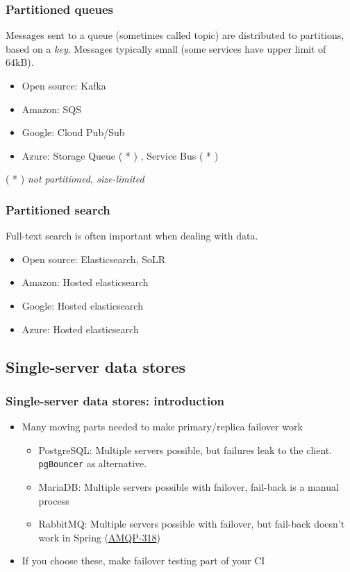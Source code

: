\documentclass[8pt]{article}
\begin{document}
\subsubsection{Partitioned queues}
\label{sec:orga696c1d}
Messages sent to a queue (sometimes called topic) are distributed to partitions, based on a \emph{key}.
Messages typically small (some services have upper limit of 64kB).

\begin{itemize}
\item Open source: Kafka
\item Amazon: SQS
\item Google: Cloud Pub/Sub
\item Azure: Storage Queue ( * ) , Service Bus ( * )
\end{itemize}

( * ) \emph{not partitioned, size-limited}
\subsubsection{Partitioned search}
\label{sec:org65f63fa}
Full-text search is often important when dealing with data.

\begin{itemize}
\item Open source: Elasticsearch, SoLR
\item Amazon: Hosted elasticsearch
\item Google: Hosted elasticsearch
\item Azure: Hosted elasticsearch
\end{itemize}
\subsection{Single-server data stores}
\label{sec:org8cc5965}
\subsubsection{Single-server data stores: introduction}
\label{sec:org81b8139}
\begin{itemize}
\item Many moving parts needed to make primary/replica failover work
\begin{itemize}
\item PostgreSQL: Multiple servers possible, but failures leak to the client. \texttt{pgBouncer} as alternative.
\item MariaDB: Multiple servers possible with failover, fail-back is a manual process
\item RabbitMQ: Multiple servers possible with failover, but fail-back doesn't work in Spring (\href{https://jira.spring.io/browse/AMQP-318}{AMQP-318})
\end{itemize}
\item If you choose these, make failover testing part of your CI
\end{itemize}
\end{document}
